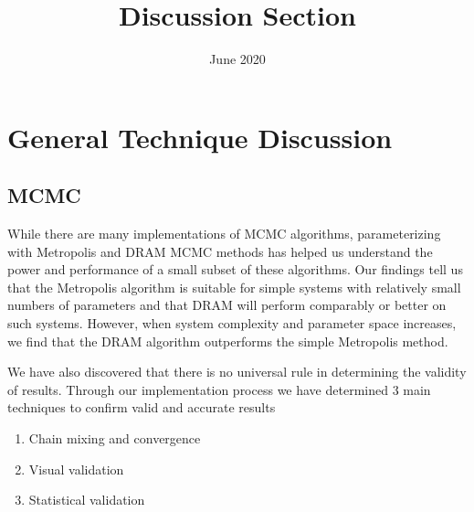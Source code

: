 \documentclass{article}
\title{Discussion Section}
\date{June 2020}
\begin{document}
\maketitle

\section{General Technique Discussion}

\subsection{MCMC}
While there are many implementations of MCMC algorithms, parameterizing with Metropolis and DRAM MCMC methods has helped us understand the power and performance of a small subset of these algorithms. Our findings tell us that the Metropolis algorithm is suitable for simple systems with relatively small numbers of parameters and that DRAM will perform comparably or better on such systems. However, when system complexity and parameter space increases, we find that the DRAM algorithm outperforms the simple Metropolis method. 
\par We have also discovered that there is no universal rule in determining the validity of results. Through our implementation process we have determined 3 main techniques to confirm valid and accurate results
\begin{enumerate}
    \item Chain mixing and convergence
    \item Visual validation
    \item Statistical validation
\end{enumerate}
\end{document}
